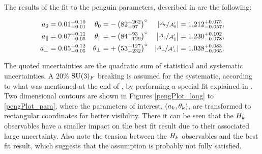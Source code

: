 The results of the \chisq fit to the penguin parameters, described in 
are the following:

\begin{subequations}
\label{peng_a_theta_results}
\begin{align}
    a_{0}         & = 0.01^{+0.10}_{-0.01} & \theta_{0}         & = -\left( 82^{+262}_{-97} \right)^\circ &  \left| \nicefrac{\mathcal{A}_{0}^{} }{\mathcal{A}_{0}^{\prime}} \right|          = 1.212^{+0.075}_{-0.057},\\
    a_{\parallel} & = 0.07^{+0.11}_{-0.05} & \theta_{\parallel} & = -\left( 84^{+93}_{-129} \right)^\circ  &  \left| \nicefrac{\mathcal{A}_{\parallel}^{} }{\mathcal{A}_{\parallel}^{\prime}} \right|  = 1.230^{+0.102}_{-0.078},\\
    a_{\perp}     & = 0.05^{+0.12}_{-0.05} & \theta_{\perp}     & = +\left( 53^{+127}_{-232} \right)^\circ &  \left| \nicefrac{\mathcal{A}_{\perp}^{} }{\mathcal{A}_{\perp}^{\prime}} \right|      = 1.038^{+0.083}_{-0.065}.
\end{align}
\end{subequations}

\noindent The quoted uncertainties are the quadratic sum of statistical and systematic uncertainties.
A $20\%$ $\mathrm{SU}(3)_F$ breaking is assumed for the systematic, according to what was mentioned at
the end of , by performing a special fit explained in .
Two dimensional contours are shown in Figures \ref{pengPlot_long} to \ref{pengPlot_para}, where the
parameters of interest, $(a_k,\theta_k)$, are transformed to rectangular coordinates for better
visibility. There it can be seen that the $H_{k}$ observables have a smaller impact on the best fit
result due to their associated large uncertainty. Also note the tension between the $H_{k}$ observables
and the best fit result, which suggests that the assumption  is probably
not fully satisfied.

